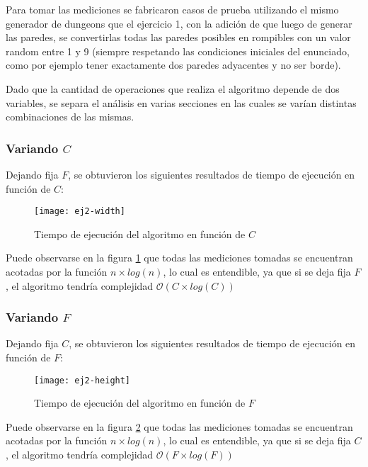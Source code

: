 Para tomar las mediciones se fabricaron casos de prueba utilizando el mismo generador de dungeons que el ejercicio 1, con la adición de que luego de generar las paredes, se convertirlas todas las paredes posibles en rompibles con un valor random entre 1 y 9 (siempre respetando las condiciones iniciales del enunciado, como por ejemplo tener exactamente dos paredes adyacentes y no ser borde).

Dado que la cantidad de operaciones que realiza el algoritmo depende de dos variables, se separa el análisis en varias secciones en las cuales se varían distintas combinaciones de las mismas.

\subsubsection{Variando $C$}

Dejando fija $F$, se obtuvieron los siguientes resultados de tiempo de ejecución en función de $C$:

\begin{figure}[H]
	\centering
	\texttt{[image: ej2-width]}
	\caption{Tiempo de ejecución del algoritmo en función de $C$}
	\label{fig:ej2-width-fig}
\end{figure}

Puede observarse en la figura \ref{fig:ej2-width-fig} que todas las mediciones tomadas se encuentran acotadas por la función $n \times log(n)$, lo cual es entendible, ya que si se deja fija $F$, el algoritmo tendría complejidad $\mathcal{O}(C \times log(C))$

\subsubsection{Variando $F$}

Dejando fija $C$, se obtuvieron los siguientes resultados de tiempo de ejecución en función de $F$:

\begin{figure}[H]
	\centering
	\texttt{[image: ej2-height]}
	\caption{Tiempo de ejecución del algoritmo en función de $F$}
	\label{fig:ej2-height-fig}
\end{figure}

Puede observarse en la figura \ref{fig:ej2-height-fig} que todas las mediciones tomadas se encuentran acotadas por la función $n \times log(n)$, lo cual es entendible, ya que si se deja fija $C$, el algoritmo tendría complejidad $\mathcal{O}(F \times log(F))$

